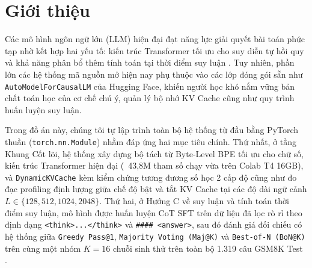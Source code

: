 \section{Giới thiệu}
Các mô hình ngôn ngữ lớn (LLM) hiện đại đạt năng lực giải quyết bài toán phức tạp nhờ kết hợp hai yếu tố: kiến trúc Transformer tối ưu cho suy diễn tự hồi quy và khả năng phân bổ thêm tính toán tại thời điểm suy luận \cite{wei2022chain,wang2023selfconsistency,snell2024scaling}. Tuy nhiên, phần lớn các hệ thống mã nguồn mở hiện nay phụ thuộc vào các lớp đóng gói sẵn như \texttt{AutoModelForCausalLM} của Hugging Face, khiến người học khó nắm vững bản chất toán học của cơ chế chú ý, quản lý bộ nhớ KV Cache cũng như quy trình huấn luyện suy luận.

Trong đồ án này, chúng tôi tự lập trình toàn bộ hệ thống từ đầu bằng PyTorch thuần (\texttt{torch.nn.Module}) nhằm đáp ứng hai mục tiêu chính. Thứ nhất, ở tầng Khung Cốt lõi, hệ thống xây dựng bộ tách từ Byte-Level BPE tối ưu cho chữ số, kiến trúc Transformer hiện đại (~43,8M tham số chạy vừa trên Colab T4 16GB), và \texttt{DynamicKVCache} kèm kiểm chứng tương đương số học 2 cấp độ cũng như đo đạc profiling định lượng giữa chế độ bật và tắt KV Cache tại các độ dài ngữ cảnh $L \in \{128, 512, 1024, 2048\}$. Thứ hai, ở Hướng C về suy luận và tính toán thời điểm suy luận, mô hình được huấn luyện CoT SFT trên dữ liệu đã lọc rò rỉ theo định dạng \texttt{<think>...</think>} và \texttt{\#\#\#\# <answer>}, sau đó đánh giá đối chiếu có hệ thống giữa \texttt{Greedy Pass@1}, \texttt{Majority Voting (Maj@K)} và \texttt{Best-of-N (BoN@K)} trên cùng một nhóm $K=16$ chuỗi sinh thử trên toàn bộ 1.319 câu GSM8K Test \cite{cobbe2021gsm8k}.
